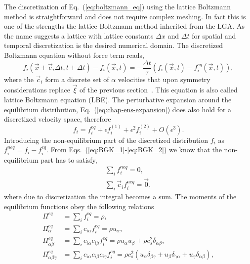 The discretization of Eq.~(\ref{eq:boltzmann_eq}) using the lattice Boltzmann method is straightforward and does not require complex meshing.
In fact this is one of the strengths the lattice Boltzmann method inherited from the LGA.
As the name suggests a lattice with lattice constants $\Delta x$ and $\Delta t$ for spatial and temporal discretization is the desired numerical domain. 
The discretized Boltzmann equation without force term reads,
\begin{equation}\label{eq:LBM_discret_noforces}
    f_i(\vec{x}+\vec{c}_i\Delta t, t+ \Delta t) - f_i(\vec{x}, t) = -\frac{\Delta t}{\tau}(f_i(\vec{x}, t) - f^{eq}_i(\vec{x}, t)),
\end{equation}
where the $\vec{c}_{i}$ form a discrete set of $\alpha$ velocities that upon symmetry considerations replace $\vec{\xi}$ of the previous section~\cite{rubinsteinTheoryLatticeBoltzmann2008}.
This equation is also called lattice Boltzmann equation (LBE). 
The perturbative expansion around the equilibrium distribution, Eq.~(\ref{eq:chap-ens-expansion}) does also hold for a discretized velocity space, therefore
\begin{equation}\label{eq:expansion_f}
    f_i = f_i^{eq} + \epsilon f_i^{(1)} + \epsilon^2 f_i^{(2)} + O(\epsilon^3).
\end{equation}
Introducing the non-equilibrium part of the discretized distribution $f_{i}$ as $f_i^{neq} = f_i - f_i^{eq}$. 
From Eqs.~(\ref{eq:BGK_1}-\ref{eq:BGK_2}) we know that the non-equilibrium part has to satisfy, 
\begin{align}\label{eq:non_constraint}
    \sum_i f_i^{neq} = 0, \\
    \sum_i \vec{c}_i f_i^{neq} = \vec{0}, 
\end{align}
where due to discretization the integral becomes a sum.
The moments of the equilibrium functions obey the following relations~\cite{chenLatticeBoltzmannMethod1998} 
\begin{align}
    \Pi^{eq} &= \sum_{i} f_{i}^{eq} = \rho, \label{eq:moments_equilibria_1}\\
    \Pi^{eq}_{\alpha} &= \sum_i c_{i\alpha}f_i^{eq} = \rho u_{\alpha}, \label{eq:moments_equilibria_2}\\
    \Pi^{eq}_{\alpha\beta} &= \sum_{i} c_{i\alpha} c_{i\beta}f_i^{eq} = \rho u_{\alpha} u_{\beta} + \rho c_s^2\delta_{\alpha\beta}, \label{eq:moments_equilibria_3}\\
    \Pi^{eq}_{\alpha\beta\gamma} &= \sum_i c_{i\alpha} c_{i\beta} c_{i\gamma}f_i^{eq} = \rho c_s^2(u_{\alpha}\delta_{\beta\gamma} + u_{\beta}\delta_{\gamma\alpha} + u_{\gamma}\delta_{\alpha\beta}), \label{eq:moments_equilibria_4}
\end{align}
